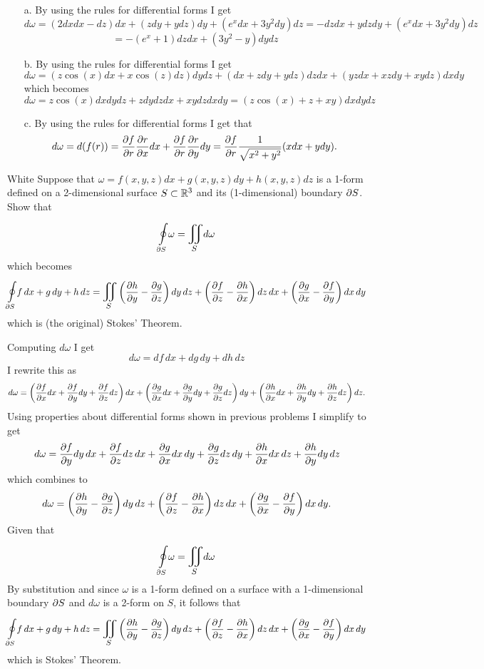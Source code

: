 \documentclass[titlepage]{article}
\begin{document}
\begin{solution}
\vspace{-2em}
\begin{itemize}
\item[a.] By using the rules for differential forms I get 
$$d\omega = (2dxdx - dz)dx + (zdy + ydz)dy + (e^xdx + 3y^2dy)dz = -dzdx + ydzdy +  (e^xdx + 3y^2dy)dz $$ 
$$= -(e^x + 1)dzdx + (3y^2 - y)dydz$$
\item[b.]By using the rules for differential forms I get
$$ d\omega = (z\cos(x) dx + x\cos(z)dz)dydz + (dx + zdy + ydz)dzdx + (yzdx + xzdy + xydz)dxdy$$
which becomes
$$d\omega  = z\cos(x)dxdydz + zdydzdx + xydzdxdy = (z\cos(x) + z + xy)dxdydz$$
\item[c.] By using the rules for differential forms I get that
$$ d\omega = d(f(r))  = \frac{\partial f}{\partial r}\frac{\partial r}{\partial x}dx + \frac{\partial f}{\partial r}\frac{\partial r}{\partial y}dy = \frac{\partial f}{\partial r}\frac{1}{\sqrt{x^2 + y^2}}(xdx+ydy).$$
\end{itemize}
\end{solution}
\begin{cproblem}{4}{White}
Suppose that $\omega = f(x,y,z)dx + g(x,y,z)dy + h(x,y,z)dz$ is a 1-form defined on a 2-dimensional surface $S\subset \mathbb{R}^3$ and its (1-dimensional) boundary $\partial S$. Show that
$$\boint{\p S}{} \omega = \bigiint{S}{} d\omega$$
which becomes
$$\boint{\p S}{} f\,dx + g\,dy + h\,dz = \bigiint{S}{} \left(\frac{\p h}{\p y} - \frac{\p g}{\p z}\right)dy\,dz + \left(\frac{\p f}{\p z} - \frac{\p h}{\p x}\right)dz\,dx + \left(\frac{\p g}{\p x} - \frac{\p f}{\p y}\right)dx\,dy$$
which is (the original) Stokes' Theorem.
\end{cproblem}
\begin{solution}
Computing $d\omega$ I get
$$d\omega = df\,dx + dg\,dy + dh\,dz$$
I rewrite this as
$$d\omega = \left(\frac{\partial f}{\partial x} dx + \frac{\partial f}{\partial y} dy + \frac{\partial f}{\partial z} dz\right)dx + \left(\frac{\partial g}{\partial x} dx + \frac{\partial g}{\partial y} dy + \frac{\partial g}{\partial z} dz\right)dy + \left(\frac{\partial h}{\partial x} dx + \frac{\partial h}{\partial y} dy + \frac{\partial h}{\partial z} dz\right)dz.$$
Using properties about differential forms shown in previous problems I simplify to get 
$$d\omega = \frac{\partial f}{\partial y} dy\,dx + \frac{\partial f}{\partial z} dz\,dx + \frac{\partial g}{\partial x} dx\,dy + \frac{\partial g}{\partial z} dz\,dy + \frac{\partial h}{\partial x} dx\,dz + \frac{\partial h}{\partial y} dy\,dz$$
which combines to
$$ d\omega = \left(\frac{\partial h}{\partial y} - \frac{\partial g}{\partial z}\right)dy\,dz + \left(\frac{\partial f}{\partial z} - \frac{\partial h}{\partial x}\right)dz\,dx + \left(\frac{\partial g}{\partial x} - \frac{\partial f}{\partial y}\right)dx\,dy.$$
Given that
$$\boint{\p S}{} \omega = \bigiint{S}{} d\omega$$
By substitution and since $\omega$ is a 1-form defined on a surface with a 1-dimensional boundary $\partial S$ and $d\omega$ is a 2-form on $S$, it follows that 
$$\boint{\p S}{} f\,dx + g\,dy + h\,dz = \bigiint{S}{} \left(\frac{\p h}{\p y} - \frac{\p g}{\p z}\right)dy\,dz + \left(\frac{\p f}{\p z} - \frac{\p h}{\p x}\right)dz\,dx + \left(\frac{\p g}{\p x} - \frac{\p f}{\p y}\right)dx\,dy$$
which is Stokes' Theorem.
\end{solution}
\end{document}
